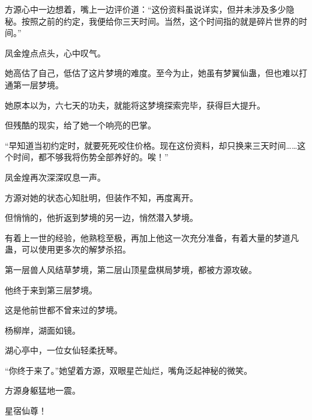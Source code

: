 \begin{this_body}
方源心中一边想着，嘴上一边评价道：“这份资料虽说详实，但并未涉及多少隐秘。按照之前的约定，我便给你三天时间。当然，这个时间指的就是碎片世界的时间。”

凤金煌点点头，心中叹气。

她高估了自己，低估了这片梦境的难度。至今为止，她虽有梦翼仙蛊，但也难以打通第一层梦境。

她原本以为，六七天的功夫，就能将这梦境探索完毕，获得巨大提升。

但残酷的现实，给了她一个响亮的巴掌。

“早知道当初约定时，就要死死咬住价格。现在这份资料，却只换来三天时间……这个时间，都不够我将伤势全部养好的。唉！”

凤金煌再次深深叹息一声。

方源对她的状态心知肚明，但装作不知，再度离开。

但悄悄的，他折返到梦境的另一边，悄然潜入梦境。

有着上一世的经验，他熟稔至极，再加上他这一次充分准备，有着大量的梦道凡蛊，可以使用更多次的解梦杀招。

第一层兽人风结草梦境，第二层山顶星盘棋局梦境，都被方源攻破。

他终于来到第三层梦境。

这是他前世都不曾来过的梦境。

杨柳岸，湖面如镜。

湖心亭中，一位女仙轻柔抚琴。

“你终于来了。”她望着方源，双眼星芒灿烂，嘴角泛起神秘的微笑。

方源身躯猛地一震。

星宿仙尊！

\end{this_body}

